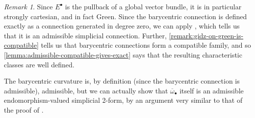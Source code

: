 \documentclass[11pt,fleqn]{article}
\theoremstyle{plain}
\theoremstyle{definition}
\theoremstyle{remark}
\newtheorem{remark}[theorem]{Remark}
\numberwithin{equation}{theorem}
\begin{document}
        \begin{remark}\label{remark:barycentric-connection-is-admissible}
            Since $E^\bullet$ is the pullback of a global vector bundle, it is in particular strongly cartesian, and in fact Gre{}en.
            Since the barycentric connection is defined exactly as a connection generated in degree zero, we can apply \cite[Theorem~3.5.5]{Hosgood2020a}, which tells us that it is an admissible simplicial connection.
            Further, \cref{remark:gidz-on-green-is-compatible} tells us that barycentric connections form a compatible family, and so \cref{lemma:admissible-compatible-gives-exact} says that the resulting characteristic classes are well defined.

            The barycentric curvature is, by definition (since the barycentric connection is admissible), admissible, but we can actually show that $\overline{\omega}_\bullet$ itself is an admissible endomorphism-valued simplicial 2-form, by an argument very similar to that of the proof of \cite[Theorem~3.5.5]{Hosgood2020a}.
        \end{remark}
\end{document}
